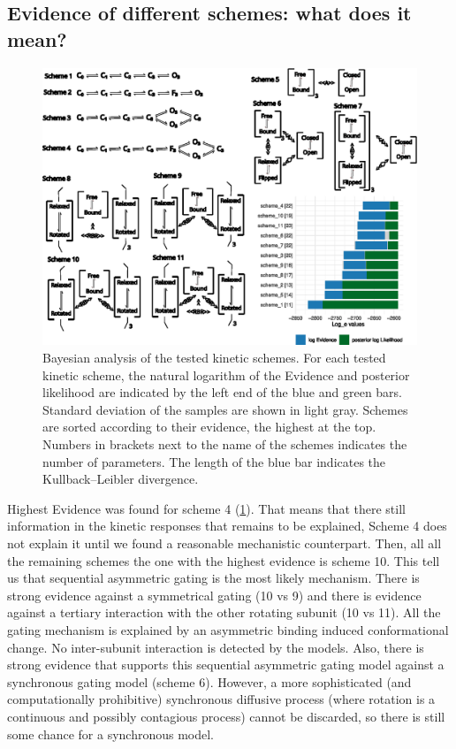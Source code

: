 \documentclass[pdflatex,sn-mathphys-num]{sn-jnl}%
\theoremstyle{thmstyleone}%
\theoremstyle{thmstyletwo}%
\theoremstyle{thmstylethree}%
\begin{document}
\subsection{Evidence of different schemes: what does it mean?}
\begin{figure}[h]
\centering
\includegraphics[width=1.0\textwidth]{Figure_1.eps}
\caption{Bayesian analysis of the tested kinetic schemes. For each tested kinetic scheme, the natural logarithm of the Evidence and posterior likelihood are indicated by the left end of the blue and green bars. Standard deviation of the samples are shown in light gray. Schemes are sorted according to their evidence, the highest at the top. Numbers in brackets next to the name of the schemes indicates the number of parameters. The length of the blue bar indicates the Kullback–Leibler divergence. }\label{fig_evidences}
\end{figure}



Highest Evidence was found for scheme 4 (\ref{fig_evidences}). That means that there still information in the kinetic responses that remains to be explained, Scheme 4 does not explain it until we found a reasonable mechanistic counterpart. 
Then, all all the remaining schemes the one with the highest evidence is scheme 10. This tell us that sequential asymmetric gating is the most likely mechanism. There is strong evidence against a symmetrical gating (10 vs 9) and there is evidence against a tertiary interaction with the other rotating subunit (10 vs 11). All the gating mechanism is explained by an asymmetric binding induced conformational change. No inter-subunit interaction is detected by the models. 
Also, there is strong evidence that supports this sequential asymmetric gating model against a synchronous gating model (scheme 6). 
However, a more sophisticated (and computationally prohibitive) synchronous diffusive process (where rotation is a continuous and possibly contagious process) cannot be discarded, so there is still some chance for a synchronous model. 
\end{document}
